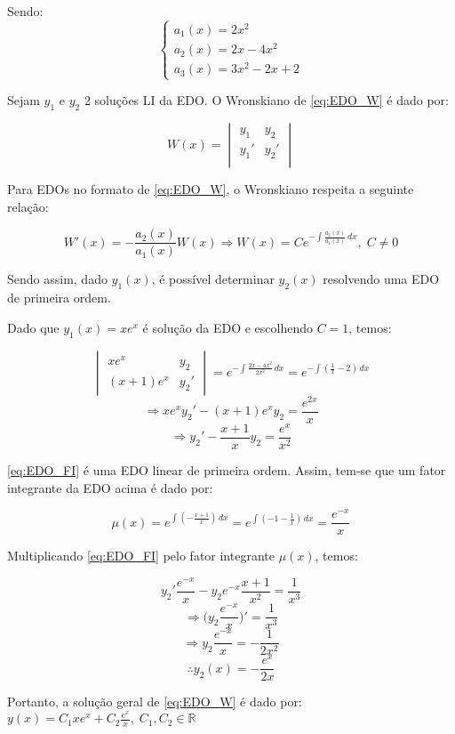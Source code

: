 \documentclass[12pt,a4paper]{article}
\newcommand{\re}{\mathbb{R}}
\begin{document}
\begin{itemize}
Sendo:
$$
\begin{cases}
	a_1(x) = 2x^2 \\
	a_2(x) = 2x - 4x^2 \\
	a_3(x) = 3x^2 - 2x + 2
\end{cases}
$$

Sejam $y_1$ e $y_2$ 2 soluções LI da EDO. O Wronskiano de \eqref{eq:EDO_W} é dado por:

$$ W(x) = \begin{vmatrix}
y_1 & y_2 \\
y_1' & y_2' \\
\end{vmatrix} $$

Para EDOs no formato de \eqref{eq:EDO_W}, o Wronskiano respeita a seguinte relação:

$$ W'(x) = -\frac{a_2(x)}{a_1(x)} W(x) \Rightarrow W(x) = C e^{-\int \frac{a_2(x)}{a_1(x)} \,dx}, \; C \neq 0 $$

Sendo assim, dado $y_1(x)$, é possível determinar $y_2(x)$ resolvendo uma EDO de primeira ordem.

Dado que $y_1(x) = x e^x$ é solução da EDO e escolhendo $C=1$, temos:

$$
\begin{vmatrix}
x e^x & y_2 \\
(x+1)e^x & y_2'
\end{vmatrix}
=  e^{-\int \frac{2x - 4x^2}{2x^2} \,dx} = e^{-\int ( \frac{1}{x} - 2 ) \,dx}
$$
$$
\Rightarrow x e^x y_2' - (x+1)e^x y_2 = \frac{e^{2x}}{x}
$$
\begin{equation}\label{eq:EDO_FI}
\Rightarrow y_2' - \frac{x+1}{x} y_2 = \frac{e^{x}}{x^2}
\end{equation}

\eqref{eq:EDO_FI} é uma EDO linear de primeira ordem. Assim, tem-se que um fator integrante da EDO acima é dado por:

$$ \mu(x) = e^{\int( -\frac{x+1}{x}) \,dx} = e^{\int( -1 - \frac{1}{x}) \,dx} = \frac{e^{-x}}{x} $$

Multiplicando \eqref{eq:EDO_FI} pelo fator integrante $\mu(x)$, temos:

$$ y_2' \frac{e^{-x}}{x} - y_2 e^{-x} \frac{x+1}{x^2} = \frac{1}{x^3} $$
$$ \Rightarrow \Big(y_2 \frac{e^{-x}}{x}\Big)' = \frac{1}{x^3} $$
$$ \Rightarrow y_2 \frac{e^{-x}}{x} = - \frac{1}{2x^2} $$
$$ \therefore y_2(x) = - \frac{e^x}{2x} $$

Portanto, a solução geral de \eqref{eq:EDO_W} é dado por: $y(x) = C_1 x e^x + C_2 \frac{e^x}{x}, \; C_1, C_2 \in \re $





\end{itemize}
\end{document}
